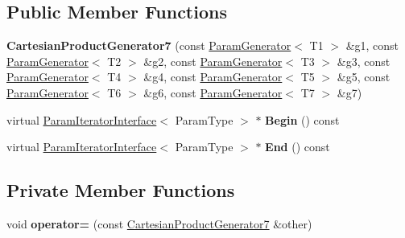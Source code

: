 \subsection*{Public Member Functions}
\begin{DoxyCompactItemize}
\item 
\mbox{\label{classtesting_1_1internal_1_1_cartesian_product_generator7_aafc9c559223d3a685028ec98aa727818}} 
{\bfseries Cartesian\+Product\+Generator7} (const \mbox{\hyperlink{classtesting_1_1internal_1_1_param_generator}{Param\+Generator}}$<$ T1 $>$ \&g1, const \mbox{\hyperlink{classtesting_1_1internal_1_1_param_generator}{Param\+Generator}}$<$ T2 $>$ \&g2, const \mbox{\hyperlink{classtesting_1_1internal_1_1_param_generator}{Param\+Generator}}$<$ T3 $>$ \&g3, const \mbox{\hyperlink{classtesting_1_1internal_1_1_param_generator}{Param\+Generator}}$<$ T4 $>$ \&g4, const \mbox{\hyperlink{classtesting_1_1internal_1_1_param_generator}{Param\+Generator}}$<$ T5 $>$ \&g5, const \mbox{\hyperlink{classtesting_1_1internal_1_1_param_generator}{Param\+Generator}}$<$ T6 $>$ \&g6, const \mbox{\hyperlink{classtesting_1_1internal_1_1_param_generator}{Param\+Generator}}$<$ T7 $>$ \&g7)
\item 
\mbox{\label{classtesting_1_1internal_1_1_cartesian_product_generator7_a081bf497e1a171f64ea6913356c6a999}} 
virtual \mbox{\hyperlink{classtesting_1_1internal_1_1_param_iterator_interface}{Param\+Iterator\+Interface}}$<$ Param\+Type $>$ $\ast$ {\bfseries Begin} () const
\item 
\mbox{\label{classtesting_1_1internal_1_1_cartesian_product_generator7_a6d649474fc8829ec9eec412c6be13c83}} 
virtual \mbox{\hyperlink{classtesting_1_1internal_1_1_param_iterator_interface}{Param\+Iterator\+Interface}}$<$ Param\+Type $>$ $\ast$ {\bfseries End} () const
\end{DoxyCompactItemize}
\subsection*{Private Member Functions}
\begin{DoxyCompactItemize}
\item 
\mbox{\label{classtesting_1_1internal_1_1_cartesian_product_generator7_ac73b936eaa95524fa90f7de7d2a8abff}} 
void {\bfseries operator=} (const \mbox{\hyperlink{classtesting_1_1internal_1_1_cartesian_product_generator7}{Cartesian\+Product\+Generator7}} \&other)
\end{DoxyCompactItemize}
